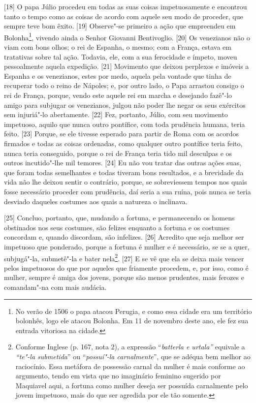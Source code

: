 {[}18{]} O papa Júlio  procedeu em todas as suas coisas impetuosamente
e encontrou tanto o tempo como as coisas de acordo com aquele seu modo
de proceder, que sempre teve bom êxito. {[}19{]} Observe"-se primeiro a
ação que empreendeu em Bolonha\footnote{No verão de 1506 o papa atacou
  Perugia, e como essa cidade era um território bolonhês, logo ele
  atacou Bolonha. Em 11 de novembro deste ano, ele fez sua entrada
  vitoriosa na cidade.}, vivendo ainda o Senhor Giovanni Bentivoglio.
{[}20{]} Os venezianos não o viam com bons olhos; o rei de Espanha, o
mesmo; com a França, estava em tratativas sobre tal ação. Todavia, ele,
com a sua ferocidade e ímpeto, moveu pessoalmente aquela expedição.
{[}21{]} Movimento que deixou perplexos e imóveis a Espanha e os
venezianos, estes por medo, aquela pela vontade que tinha de recuperar
todo o reino de Nápoles; e, por outro lado, o Papa arrastou consigo o
rei de França, porque, vendo este aquele rei em marcha e desejando
fazê"-lo amigo para subjugar os venezianos, julgou não poder lhe negar os
seus exércitos sem injuriá"-lo abertamente. {[}22{]} Fez, portanto,
Júlio, com seu movimento impetuoso, aquilo que nunca outro pontífice,
com toda prudência humana, teria feito. {[}23{]} Porque, se ele tivesse
esperado para partir de Roma com os acordos firmados e todas as coisas
ordenadas, como qualquer outro pontífice teria feito, nunca teria
conseguido, porque o rei de França teria tido mil desculpas e os outros
incutido"-lhe mil temores. {[}24{]} Eu não vou tratar das outras ações
suas, que foram todas semelhantes e todas tiveram bons resultados, e a
brevidade da vida não lhe deixou sentir o contrário, porque, se
sobreviessem tempos nos quais fosse necessário proceder com prudência,
daí seria a sua ruína, pois nunca se teria desviado daqueles costumes
aos quais a natureza o inclinava.

{[}25{]} Concluo, portanto, que, mudando a fortuna, e permanecendo os
homens obstinados nos seus costumes, são felizes enquanto a fortuna e os
costumes concordam e, quando discordam, são infelizes. {[}26{]} Acredito
que seja melhor ser impetuoso que ponderado, porque a fortuna é mulher e
é necessário, se se a quer, subjugá"-la, submetê"-la e bater
nela\footnote{Conforme Inglese (p. 167, nota 2), a expressão
  ``\emph{batterla e urtala''} equivale a \emph{``te"-la submetida}'' ou
  ``\emph{possuí"-la carnalmente}'', que se adéqua bem melhor ao
  raciocínio. Essa metáfora de possessão carnal da mulher é mais
  conforme ao argumento, tendo em vista que no imaginário feminino
  sugerido por Maquiavel aqui, a fortuna como mulher deseja ser possuída
  carnalmente pelo jovem impetuoso, mais do que ser agredida por ele tão
  somente.}. {[}27{]} E se vê que ela se deixa mais vencer pelos
impetuosos do que por aqueles que friamente procedem, e, por isso, como
é mulher, sempre é amiga dos jovens, porque são menos prudentes, mais
ferozes e comandam"-na com mais audácia.

